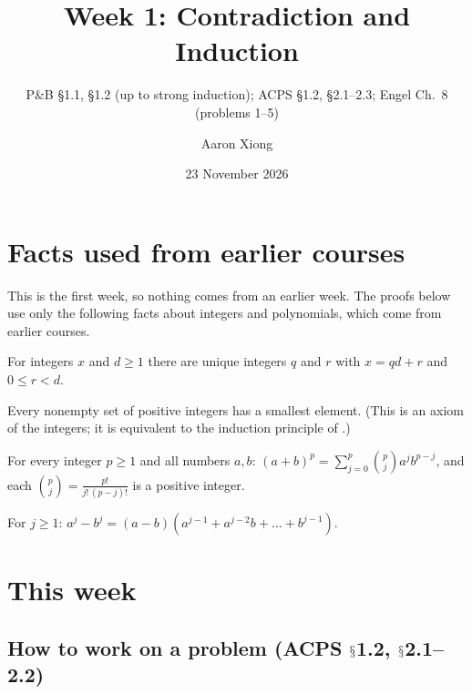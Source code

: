 \documentclass[10pt]{scrartcl}
\title{Week 1: Contradiction and Induction}
\subtitle{P\&B \S1.1, \S1.2 (up to strong induction); ACPS \S1.2, \S2.1--2.3; Engel Ch.~8 (problems 1--5)}
\author{Aaron Xiong}
\date{23 November 2026}
\renewcommand{\S}{\ensuremath{\mathsection}}
\begin{document}
\maketitle

\section{Facts used from earlier courses}

This is the first week, so nothing comes from an earlier week. The proofs below use only the following facts about integers and polynomials, which come from earlier courses.

\begin{enumerate}[label=(T\arabic*),leftmargin=2.6em,itemsep=8pt]
  \ii {} For integers $x$ and $d \geq 1$ there are unique integers $q$ and $r$ with $x = qd + r$ and $0 \leq r < d$.

  \ii {} Every nonempty set of positive integers has a smallest element. (This is an axiom of the integers; it is equivalent to the induction principle of .)

  \ii {} For every integer $p \geq 1$ and all numbers $a, b$: $(a+b)^p = \sum_{j=0}^{p} \binom pj a^j b^{p-j}$, and each $\binom pj = \frac{p!}{j!\,(p-j)!}$ is a positive integer.

  \ii {}

  \ii {} For $j \geq 1$: $a^j - b^j = (a-b)(a^{j-1} + a^{j-2}b + \dots + b^{j-1})$.
\end{enumerate}

\section{This week}

\subsection{How to work on a problem (ACPS \S1.2, \S2.1--2.2)}
\end{document}
